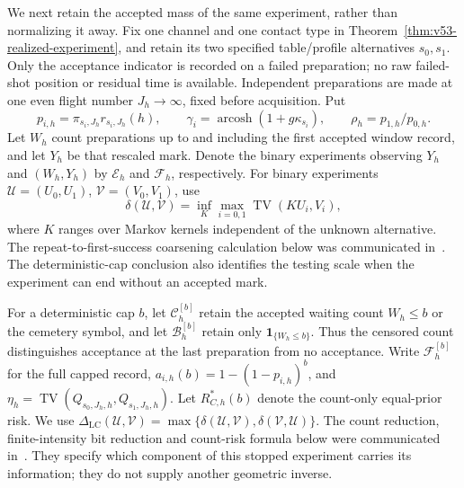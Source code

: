 We next retain the accepted mass of the same experiment, rather than
normalizing it away.  Fix one channel and one contact type in
Theorem~\ref{thm:v53-realized-experiment}, and retain its two specified
table/profile alternatives $s_0,s_1$.  Only the acceptance indicator is
recorded on a failed preparation; no raw failed-shot position or residual
time is available.  Independent preparations are made at one even flight
number $J_h\to\infty$, fixed before acquisition.  Put
\begin{equation}\label{eq:v54-accepted-probability}
 p_{i,h}=\pi_{s_i,J_h}r_{s_i,J_h}(h),\qquad
 \gamma_i=\operatorname{arcosh}(1+g\kappa_{s_i}),\qquad
 \rho_h=p_{1,h}/p_{0,h}.
\end{equation}
Let $W_h$ count preparations up to and including the first accepted
window record, and let $Y_h$ be that rescaled mark.  Denote the binary
experiments observing $Y_h$ and $(W_h,Y_h)$ by $\mathcal E_h$ and
$\mathcal F_h$, respectively.  For binary experiments
$\mathcal U=(U_0,U_1)$, $\mathcal V=(V_0,V_1)$, use
\[
 \delta(\mathcal U,\mathcal V)
   =\inf_K\max_{i=0,1}\operatorname{TV}(KU_i,V_i),
\]
where $K$ ranges over Markov kernels independent of the unknown
alternative.  The repeat-to-first-success coarsening calculation below
was communicated in~\cite{A2ReviewV53}.  The deterministic-cap conclusion
also identifies the testing scale when the experiment can end without an
accepted mark.


For a deterministic cap $b$, let $\mathcal C_h^{[b]}$ retain the
accepted waiting count $W_h\le b$ or the cemetery symbol, and let
$\mathcal B_h^{[b]}$ retain only $\mathbf1_{\{W_h\le b\}}$.  Thus the
censored count distinguishes acceptance at the last preparation from no
acceptance.  Write $\mathcal F_h^{[b]}$ for the full capped record,
$a_{i,h}(b)=1-(1-p_{i,h})^b$, and
$\eta_h=\operatorname{TV}(Q_{s_0,J_h,h},Q_{s_1,J_h,h})$.
Let $R_{C,h}^*(b)$ denote the count-only equal-prior risk.  We use
$\Delta_{\mathrm{LC}}(\mathcal U,\mathcal V)
=\max\{\delta(\mathcal U,\mathcal V),\delta(\mathcal V,\mathcal U)\}$.
The count reduction, finite-intensity bit reduction and count-risk formula
below were communicated in~\cite{A2ReviewV54First,A2ReviewV54Second}.
They specify which component of this stopped experiment carries its
information; they do not supply another geometric inverse.

